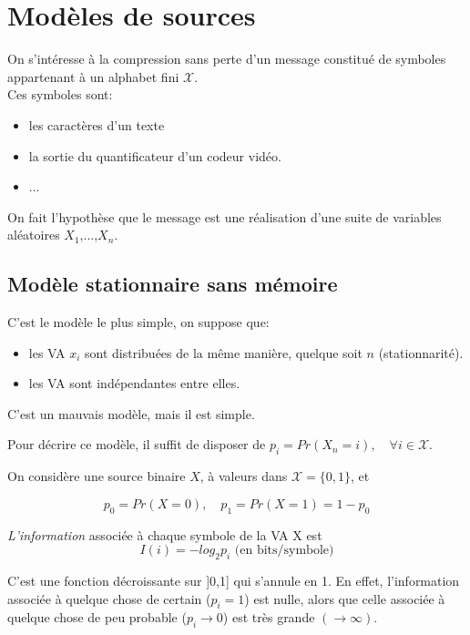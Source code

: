 \documentclass[main.tex]{subfiles}
\begin{document}
\newcommand{\X}{\mathcal{X}}
\section{Modèles de sources}

On s'intéresse à la compression sans perte d'un message constitué de symboles appartenant à un alphabet fini $\X$.\\

Ces symboles sont:
\begin{itemize}
\item les caractères d'un texte
\item la sortie du quantificateur d'un codeur vidéo.
\item ...
\end{itemize}
\bigbreak
On fait l'hypothèse que le message est une réalisation d'une suite de variables aléatoires $X_1$,...,$X_n$.\\

\subsection{Modèle stationnaire sans mémoire}

C'est le modèle le plus simple, on suppose que:
\begin{itemize}
\item les VA $x_i$ sont distribuées de la même manière, quelque soit $n$ (stationnarité).
\item les VA sont indépendantes entre elles.
\end{itemize}
\smallbreak
C'est un mauvais modèle, mais il est simple.

Pour décrire ce modèle, il suffit de disposer de $p_i = Pr(X_n=i), \quad \forall i \in \X$.\\

\begin{exemple}
On considère une source binaire $X$, à valeurs dans $\X = \{0,1\}$, et

\[p_0 = Pr(X=0),\quad p_1 = Pr(X=1) = 1 - p_0\]
\end{exemple}

\begin{defin}
\emph{L'information} associée à chaque symbole de la VA X est \[I(i) = -log_2 p_i \text{ (en bits/symbole)} \]
\end{defin}

\begin{rem}
C'est une fonction décroissante sur ]0,1] qui s'annule en 1. En effet, l'information associée à quelque chose de certain ($p_i=1$) est nulle, alors que celle associée à quelque chose de peu probable ($p_i\rightarrow 0$) est très grande $(\rightarrow \infty)$.
\end{rem}
\end{document}
